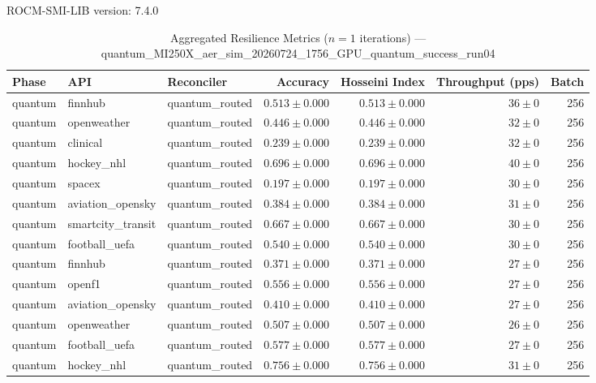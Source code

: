 ROCM-SMI-LIB version: 7.4.0

\begin{table}[htbp]
\caption{Aggregated Resilience Metrics ($n=1$ iterations) --- quantum_MI250X_aer_sim_20260724_1756_GPU_quantum_success_run04}
\begin{tabular}{l l l r r r r}
\hline
Phase & API & Reconciler & Accuracy & Hosseini Index & Throughput (pps) & Batch \\
\hline
quantum & finnhub & quantum\_routed & $0.513\pm0.000$ & $0.513\pm0.000$ & $36\pm0$ & 256 \\
quantum & openweather & quantum\_routed & $0.446\pm0.000$ & $0.446\pm0.000$ & $32\pm0$ & 256 \\
quantum & clinical & quantum\_routed & $0.239\pm0.000$ & $0.239\pm0.000$ & $32\pm0$ & 256 \\
quantum & hockey\_nhl & quantum\_routed & $0.696\pm0.000$ & $0.696\pm0.000$ & $40\pm0$ & 256 \\
quantum & spacex & quantum\_routed & $0.197\pm0.000$ & $0.197\pm0.000$ & $30\pm0$ & 256 \\
quantum & aviation\_opensky & quantum\_routed & $0.384\pm0.000$ & $0.384\pm0.000$ & $31\pm0$ & 256 \\
quantum & smartcity\_transit & quantum\_routed & $0.667\pm0.000$ & $0.667\pm0.000$ & $30\pm0$ & 256 \\
quantum & football\_uefa & quantum\_routed & $0.540\pm0.000$ & $0.540\pm0.000$ & $30\pm0$ & 256 \\
quantum & finnhub & quantum\_routed & $0.371\pm0.000$ & $0.371\pm0.000$ & $27\pm0$ & 256 \\
quantum & openf1 & quantum\_routed & $0.556\pm0.000$ & $0.556\pm0.000$ & $27\pm0$ & 256 \\
quantum & aviation\_opensky & quantum\_routed & $0.410\pm0.000$ & $0.410\pm0.000$ & $27\pm0$ & 256 \\
quantum & openweather & quantum\_routed & $0.507\pm0.000$ & $0.507\pm0.000$ & $26\pm0$ & 256 \\
quantum & football\_uefa & quantum\_routed & $0.577\pm0.000$ & $0.577\pm0.000$ & $27\pm0$ & 256 \\
quantum & hockey\_nhl & quantum\_routed & $0.756\pm0.000$ & $0.756\pm0.000$ & $31\pm0$ & 256 \\

\end{tabular}
\end{table}
